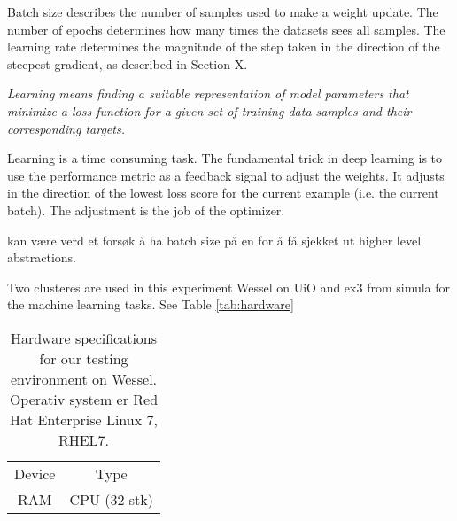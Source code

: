 Batch size describes the number of samples used to make a weight update. The number of epochs determines how many times the datasets sees all samples. The learning rate determines the magnitude of the step taken in the direction of the steepest gradient, as described in Section X.

\textit{Learning means finding a suitable representation of model parameters that minimize a loss function for a given set of training data samples and their corresponding targets.} 

Learning is a time consuming task. The fundamental trick in deep learning is to use the performance metric as a feedback signal to adjust the weights. It adjusts in the direction of the lowest loss score for the current example (i.e. the current batch). The adjustment is the job of the optimizer.


kan være verd et forsøk å ha batch size på en for å få sjekket ut higher level abstractions.

Two clusteres are used in this experiment Wessel on UiO and ex3 from simula for the machine learning tasks. See Table
\ref{tab:hardware}
\begin{table}[ht]
    \centering
    \begin{tabular}{c|c}
        Device &  Type  \\
        RAM  & 
        CPU (32 stk)  &
    \end{tabular}
    \caption{Hardware specifications for our testing environment on Wessel. Operativ system er Red Hat Enterprise Linux 7, RHEL7.}
    \label{tab:hardware_wessel}
\end{table}




